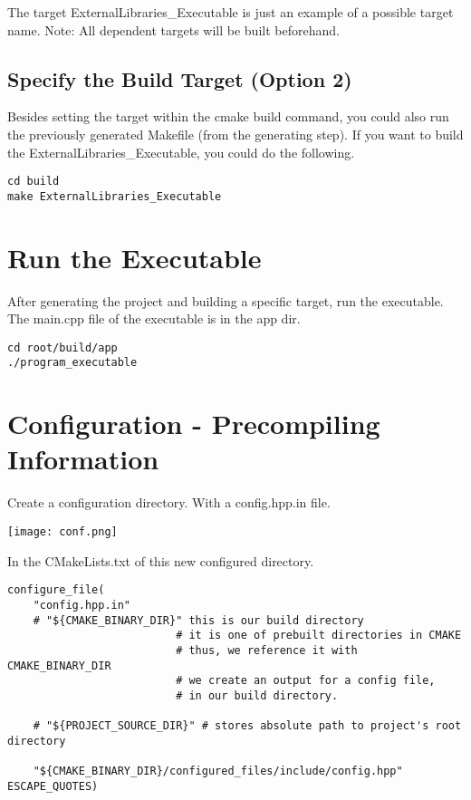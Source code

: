 The target ExternalLibraries\_Executable is just an example of a possible target name.
Note: All dependent targets will be built beforehand.

\subsection{Specify the Build Target (Option 2)}

Besides setting the target within the cmake build command, you could also run the previously generated Makefile (from the generating step).
If you want to build the ExternalLibraries\_Executable, you could do the following.

\begin{verbatim}
cd build
make ExternalLibraries_Executable
\end{verbatim}

\section{Run the Executable}

After generating the project and building a specific target, run the executable.
The main.cpp file of the executable is in the app dir. 

\begin{verbatim}
cd root/build/app
./program_executable
\end{verbatim}

\section{Configuration - Precompiling Information}

Create a configuration directory. With a config.hpp.in file.

\begin{center}
    \texttt{[image: conf.png]}
\end{center}

In the CMakeLists.txt of this new configured directory.

\begin{verbatim}
configure_file(
    "config.hpp.in"
    # "${CMAKE_BINARY_DIR}" this is our build directory
                          # it is one of prebuilt directories in CMAKE
                          # thus, we reference it with CMAKE_BINARY_DIR
                          # we create an output for a config file, 
                          # in our build directory.

    # "${PROJECT_SOURCE_DIR}" # stores absolute path to project's root directory

    "${CMAKE_BINARY_DIR}/configured_files/include/config.hpp" ESCAPE_QUOTES)
\end{verbatim}

